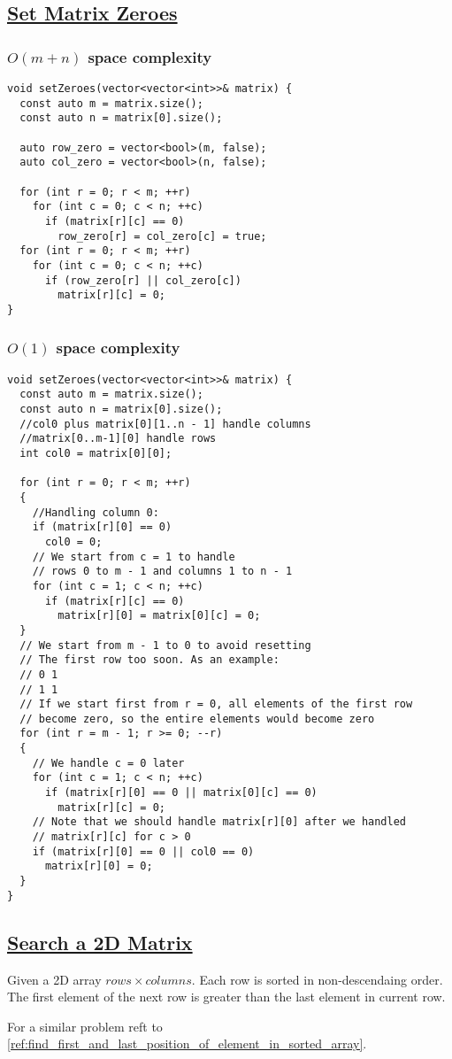 \documentclass{book}
\begin{document}
	\subsection{\href{https://leetcode.com/problems/set-matrix-zeroes/}{Set Matrix Zeroes}}
	\subsubsection{$O(m + n)$ space complexity}
	\begin{lstlisting}
void setZeroes(vector<vector<int>>& matrix) {
  const auto m = matrix.size();
  const auto n = matrix[0].size();
  
  auto row_zero = vector<bool>(m, false);
  auto col_zero = vector<bool>(n, false);
  
  for (int r = 0; r < m; ++r)
    for (int c = 0; c < n; ++c)
      if (matrix[r][c] == 0)
        row_zero[r] = col_zero[c] = true;        
  for (int r = 0; r < m; ++r)
    for (int c = 0; c < n; ++c)
      if (row_zero[r] || col_zero[c])
        matrix[r][c] = 0;
}
	\end{lstlisting}
	\subsubsection{$O(1)$ space complexity}
	\begin{lstlisting}
void setZeroes(vector<vector<int>>& matrix) {
  const auto m = matrix.size();
  const auto n = matrix[0].size();
  //col0 plus matrix[0][1..n - 1] handle columns
  //matrix[0..m-1][0] handle rows
  int col0 = matrix[0][0];
  
  for (int r = 0; r < m; ++r)
  {
    //Handling column 0:
    if (matrix[r][0] == 0)
      col0 = 0;
    // We start from c = 1 to handle 
    // rows 0 to m - 1 and columns 1 to n - 1
    for (int c = 1; c < n; ++c)
      if (matrix[r][c] == 0)
        matrix[r][0] = matrix[0][c] = 0;
  }
  // We start from m - 1 to 0 to avoid resetting
  // The first row too soon. As an example:
  // 0 1
  // 1 1
  // If we start first from r = 0, all elements of the first row
  // become zero, so the entire elements would become zero
  for (int r = m - 1; r >= 0; --r)
  {
    // We handle c = 0 later
    for (int c = 1; c < n; ++c)
      if (matrix[r][0] == 0 || matrix[0][c] == 0)
        matrix[r][c] = 0;
    // Note that we should handle matrix[r][0] after we handled
    // matrix[r][c] for c > 0
    if (matrix[r][0] == 0 || col0 == 0)
      matrix[r][0] = 0;
  }
}
	\end{lstlisting}
	\subsection{\href{https://leetcode.com/problems/search-a-2d-matrix/}{Search a 2D Matrix}}
	Given a 2D array $rows \times columns$. Each row is sorted in non-descendaing order. The first element of the next row is greater than the last element in current row.
	\label{ref:search_a_2d_matrix}
	\par For a similar problem reft to \ref{ref:find_first_and_last_position_of_element_in_sorted_array}.
\end{document}
